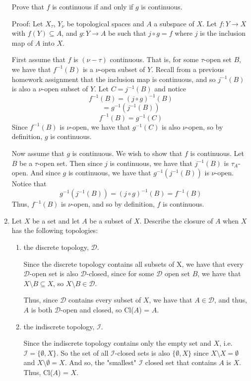\documentclass[12pt]{article}
\begin{document}
\begin{enumerate}
Prove that $f$ is continuous if and only if $g$ is continuous.

Proof: Let $X_{\tau}$, $Y_{\nu}$ be topological spaces and $A$ a subspace of $X$. Let $f: Y \to X$ with $f(Y) \subseteq A$, and $g: Y \to A$ be such that $j \circ g = f$ where $j$ is the inclusion map of $A$ into $X$. 

First assume that $f$ is $(\nu - \tau)$ continuous. That is, for some $\tau$-open set $B$, we have that $f^{-1}(B)$ is a $\nu$-open subset of $Y$. Recall from a previous homework assignment that the inclusion map is continuous, and so $j^{-1}(B)$ is also a $\nu$-open subset of $Y$. Let $C = j^{-1}(B)$ and notice
\[f^{-1}(B) = (j \circ g)^{-1}(B)\]
\[= g^{-1}(j^{-1}(B))\]
\[f^{-1}(B) = g^{-1}(C)\]
Since $f^{-1}(B)$ is $\nu$-open, we have that $g^{-1}(C)$ is also $\nu$-open, so by definition, $g$ is continuous. 

Now assume that $g$ is continuous. We wish to show that $f$ is continuous. Let $B$ be a $\tau$-open set. Then since $j$ is continuous, we have that $j^{-1}(B)$ is $\tau_A$-open. And since $g$ is continuous, we have that $g^{-1}(j^{-1}(B))$ is $\nu$-open. Notice that
\[g^{-1}(j^{-1}(B)) = (j \circ g)^{-1}(B) = f^{-1}(B)\]
Thus, $f^{-1}(B)$ is $\nu$-open, and so by definition, $f$ is continuous.


\item Let $X$ be a set and let $A$ be a subset of $X$. Describe the closure of $A$ when $X$ has the following topologies:
\begin{enumerate}
\item the discrete topology, $\mathcal{D}$.

Since the discrete topology contains all subsets of X, we have that every $\mathcal{D}$-open set is also $\mathcal{D}$-closed, since for some $\mathcal{D}$ open set $B$, we have that $X \setminus B \subseteq X $, so $X \setminus B \in \mathcal{D}$. 

Thus, since $\mathcal{D}$ contains every subset of $X$, we have that $A \in \mathcal{D}$, and thus, $A$ is both $\mathcal{D}$-open and closed, so Cl($A$) =  $A$.


\item the indiscrete topology, $\mathcal{I}$.

Since the indiscrete topology contains only the empty set and $X$, i.e. $\mathcal{I} = \{\emptyset, X\}$. So the set of all $\mathcal{I}$-closed sets is also $\{\emptyset, X\}$ since $X \setminus X = \emptyset$ and $X \setminus \emptyset = X$. And so, the "smallest" $\mathcal{I}$ closed set that contains $A$ is $X$. Thus, Cl($A$) = $X$.



\end{enumerate}
\end{enumerate}
\end{document}
